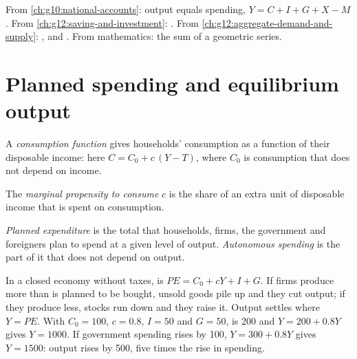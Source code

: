 \begin{recall}
From \cref{ch:g10:national-accounts}: output equals spending, $Y = C + I + G + X - M$. From \cref{ch:g12:saving-and-investment}: . From
\cref{ch:g12:aggregate-demand-and-supply}: ,  and . From mathematics: the sum of a geometric series.
\end{recall}

\section{Planned spending and equilibrium output}\label{sec:g12:keynesian-cross:equilibrium}

\begin{definition}\label{def:g12:keynesian-cross:consumption-function}
A \emph{consumption function} gives households' consumption as a function of their disposable income: here $C = C_0 + c\,(Y - T)$, where $C_0$
is consumption that does not depend on income.
\end{definition}

\begin{definition}\label{def:g12:keynesian-cross:mpc}
The \emph{marginal propensity to consume} $c$ is the share of an extra unit of disposable income that is spent on consumption.
\end{definition}

\begin{definition}\label{def:g12:keynesian-cross:planned-expenditure}
\emph{Planned expenditure} is the total that households, firms, the government and foreigners plan to spend at a given level of output.
\emph{Autonomous spending}\label{def:g12:keynesian-cross:autonomous} is the part of it that does not depend on output.
\end{definition}

In a closed economy without taxes,  is $PE = C_0 + cY + I + G$. If firms produce more than is planned to be bought, unsold goods pile up and they cut
output; if they produce less, stocks run down and they raise it. Output settles where $Y = PE$. With $C_0 = 100$, $c = 0.8$, $I = 50$ and $G = 50$,  is
200 and $Y = 200 + 0.8Y$ gives $Y = 1000$. If government spending rises by 100, $Y = 300 + 0.8Y$ gives $Y = 1500$: output rises by 500, five times the rise in spending.

